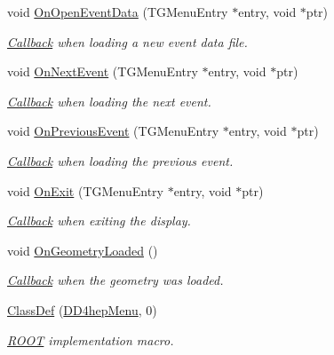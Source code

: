 \begin{DoxyCompactItemize}
void \hyperlink{class_d_d4hep_1_1_d_d4hep_menu_ac8428b7326df0a54c672ece045fe8d97}{On\+Open\+Event\+Data} (T\+G\+Menu\+Entry $\ast$entry, void $\ast$ptr)
\begin{DoxyCompactList}\small\item\em \hyperlink{class_d_d4hep_1_1_callback}{Callback} when loading a new event data file. \end{DoxyCompactList}\item 
void \hyperlink{class_d_d4hep_1_1_d_d4hep_menu_aed31811bd4340d374fb002792c17cecd}{On\+Next\+Event} (T\+G\+Menu\+Entry $\ast$entry, void $\ast$ptr)
\begin{DoxyCompactList}\small\item\em \hyperlink{class_d_d4hep_1_1_callback}{Callback} when loading the next event. \end{DoxyCompactList}\item 
void \hyperlink{class_d_d4hep_1_1_d_d4hep_menu_aa5da4d833f39a73fe9f22e0b0016018e}{On\+Previous\+Event} (T\+G\+Menu\+Entry $\ast$entry, void $\ast$ptr)
\begin{DoxyCompactList}\small\item\em \hyperlink{class_d_d4hep_1_1_callback}{Callback} when loading the previous event. \end{DoxyCompactList}\item 
void \hyperlink{class_d_d4hep_1_1_d_d4hep_menu_a62954b16db94eb57f3c88600042f1a3e}{On\+Exit} (T\+G\+Menu\+Entry $\ast$entry, void $\ast$ptr)
\begin{DoxyCompactList}\small\item\em \hyperlink{class_d_d4hep_1_1_callback}{Callback} when exiting the display. \end{DoxyCompactList}\item 
void \hyperlink{class_d_d4hep_1_1_d_d4hep_menu_a4cc12c7e0047c638119e0807f860fbc1}{On\+Geometry\+Loaded} ()
\begin{DoxyCompactList}\small\item\em \hyperlink{class_d_d4hep_1_1_callback}{Callback} when the geometry was loaded. \end{DoxyCompactList}\item 
\hyperlink{class_d_d4hep_1_1_d_d4hep_menu_af3b9cf3c445924532b16883e46833624}{Class\+Def} (\hyperlink{class_d_d4hep_1_1_d_d4hep_menu}{D\+D4hep\+Menu}, 0)
\begin{DoxyCompactList}\small\item\em \hyperlink{namespace_r_o_o_t}{R\+O\+OT} implementation macro. \end{DoxyCompactList}\end{DoxyCompactItemize}
